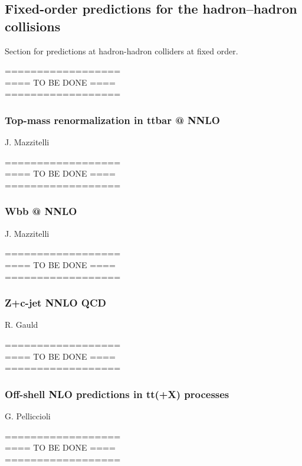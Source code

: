 \documentclass{FBR_Bericht_2025}
\begin{document}
\subsection{Fixed-order predictions for the hadron--hadron collisions}
\begin{refsection}
Section for predictions at hadron-hadron colliders at fixed order.

%
{\color{red} ==================\\ ====\; TO BE DONE\; ====\\ ==================}
%
\subsubsection{Top-mass renormalization in ttbar @ NNLO}
\begin{Namen}
J. Mazzitelli
\end{Namen}
%
{\color{red} ==================\\ ====\; TO BE DONE\; ====\\ ==================}
%
\subsubsection{Wbb @ NNLO}
\begin{Namen}
J. Mazzitelli
\end{Namen}
%
{\color{red} ==================\\ ====\; TO BE DONE\; ====\\ ==================}
%
\subsubsection{Z+c-jet NNLO QCD}
\begin{Namen}
R. Gauld
\end{Namen}
%
{\color{red} ==================\\ ====\; TO BE DONE\; ====\\ ==================}
%
\subsubsection{Off-shell NLO predictions in tt(+X) processes}
\begin{Namen}
G. Pelliccioli
\end{Namen}
%
{\color{red} ==================\\ ====\; TO BE DONE\; ====\\ ==================}
%
\printbibliography[heading=subbibliography]
\end{refsection}
\end{document}
